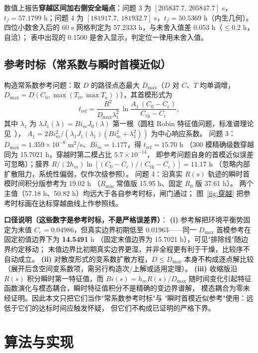 \documentclass[12pt,a4paper]{ctexart}
\numberwithin{equation}{section}
\begin{document}
数值上报告\textbf{穿越区间加右侧安全端点}：问题 3 为 $[205837.7,\,205847.7]$ s，
$t_f=57.1799$ h；问题 4 为 $[181917.7,\,181932.7]$ s，$t_f=50.5369$ h（内生几何）。
四位小数舍入后的 60 s 网格判定为 57.2333 h，与未舍入值差 0.053 h（$\le0.2$ h，自洽）；
表中出现的 0.1500 是舍入显示，判定位一律用未舍入值。

\subsection{参考时标（常系数与瞬时首模近似）}
构造常系数参考问题：取 $D$ 的路径点态最大 $D_{\max}$（$D$ 对 $C$、$T$ 均单调增，
$D_{\max}=D(C_0,\max(T_0,\max T_a))$），其首模形式为
\begin{equation}
t_{\mathrm{ref}}=\frac{R^2}{D_{\max}\lambda_1^2}\,
\ln\!\frac{A_1\,(C_0-C_e)}{C_{\mathrm{th}}-C_e},
\label{eq:下界}
\end{equation}
其中 $\lambda_1$ 为 $\lambda J_1(\lambda)=Bi_m J_0(\lambda)$ 第一根（圆柱 Robin
特征值问题，标准谱理论见~\cite{crank}），
$A_1=2Bi_m^2/(\lambda_1J_1(\lambda_1)(Bi_m^2+\lambda_1^2))$ 为中心响应系数。
问题 3：$D_{\max}=1.359\times10^{-8}$ m$^2$/s、$Bi_m=1.177$，得 $t_{\mathrm{ref}}=15.70$ h
（300 模精确级数穿越同为 15.7021 h，穿越时第二模占比 $5.7\times10^{-14}$，
即参考问题自身的首模近似误差可忽略）；膜界
$R/(2h_m)\ln[(C_0-C_e)/(C_{\mathrm{th}}-C_e)]=11.17$ h
（忽略内部扩散阻力，系统性偏弱，仅作次级参照）。
问题 4：沿真实 $R(s)$ 轨迹的瞬时首模时间积分版参考为 $19.02$ h
（$R_{\min}$ 常值版 15.95 h、固定 $R_0$ 版 37.61 h）。
两个主值（57.18 h、50.82 h）均远大于各自参考时标，闸门通过；
图~\ref{fig:穿越} 把参考时标画在达标穿越曲线上作参照线。

\textbf{口径说明（这些数字是参考时标，不是严格误差界）}：
\textbf{(i)} 参考解把环境平衡势固定为末值 $C_e=0.04986$，但真实边界初期低至
0.01963——同一 $D_{\max}$ 首模参考在固定初值边界下为 \textbf{14.5491} h
（固定末值边界为 15.7021 h），可见"排除线"随边界约定移动；
末值边界比初期真实边界更湿，并非全程更有利于干燥，比较序不自动成立。
\textbf{(ii)} 对散度形式的变系数扩散方程，$D\le D_{\max}$ 本身不构成逐点解比较
（展开后含空间变系数项，需另行构造次/上解或适用定理）。
\textbf{(iii)} 收缩版沿 $R(s)$ 积分瞬时第一特征值，而 $Bi(s)=h_mR(s)/D_{\max}$
随时间变化引起特征函数演化与模态耦合，瞬时特征值积分不是精确的变边界谱解，
模态耦合为零未经证明。因此本文只把它们当作"常系数参考时标"与
"瞬时首模近似参考"使用：远低于它们的达标时间应触发怀疑，
但它们不构成已证明的严格下界。

\section{算法与实现}\label{sec:算法}
\end{document}
